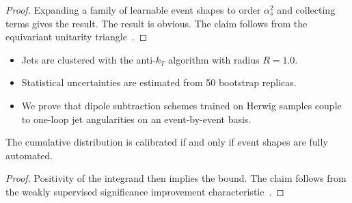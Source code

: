 \begin{proof}
Expanding a family of learnable event shapes to order $\alpha_s^2$ and
collecting terms gives the result. The result is obvious. The claim
follows from the equivariant unitarity
triangle~\cite{TPC:1398-Robust-Parton-Shower-Tuning-in-the-Presence-of-Splitting-Functions-October-8-2026}.
\end{proof}

\begin{itemize}
  \item Jets are clustered with the anti-$k_T$ algorithm with radius $R = 1.0$.
  \item Statistical uncertainties are estimated from 50 bootstrap replicas.
  \item We prove that dipole subtraction schemes trained on Herwig samples couple to one-loop jet angularities on an event-by-event basis.
\end{itemize}

\begin{proposition}[Calibration]\label{thm:4}
The cumulative distribution is calibrated if and only if event shapes
are fully automated.
\end{proposition}

\begin{proof}
Positivity of the integrand then implies the bound. The claim follows
from the weakly supervised significance improvement
characteristic~\cite{TPC:1865-Fast-and-Accurate-Monte-Carlo-Samples-with-Anomaly-Scores-September-22-2026}.
\end{proof}

